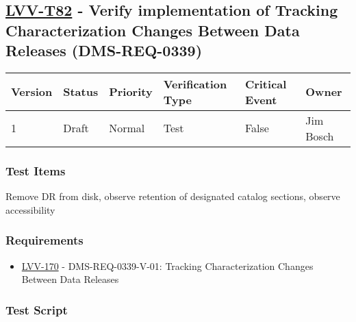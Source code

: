 \hypertarget{lvv-t82---verify-implementation-of-tracking-characterization-changes-between-data-releases-dms-req-0339}{%
\subsection{\texorpdfstring{\href{https://jira.lsstcorp.org/secure/Tests.jspa\#/testCase/LVV-T82}{LVV-T82}
- Verify implementation of Tracking Characterization Changes Between
Data Releases
(DMS-REQ-0339)}{LVV-T82 - Verify implementation of Tracking Characterization Changes Between Data Releases (DMS-REQ-0339)}}\label{lvv-t82---verify-implementation-of-tracking-characterization-changes-between-data-releases-dms-req-0339}}

\begin{longtable}[]{@{}llllll@{}}
\toprule
Version & Status & Priority & Verification Type & Critical Event &
Owner\tabularnewline
\midrule
\endhead
1 & Draft & Normal & Test & False & Jim Bosch\tabularnewline
\bottomrule
\end{longtable}

\hypertarget{test-items-58}{%
\subsubsection{Test Items}\label{test-items-58}}

Remove DR from disk, observe retention of designated catalog sections,
observe accessibility

\hypertarget{requirements-59}{%
\subsubsection{Requirements}\label{requirements-59}}

\begin{itemize}
\tightlist
\item
  \href{https://jira.lsstcorp.org/browse/LVV-170}{LVV-170} -
  DMS-REQ-0339-V-01: Tracking Characterization Changes Between Data
  Releases
\end{itemize}

\hypertarget{test-script-59}{%
\subsubsection{Test Script}\label{test-script-59}}

